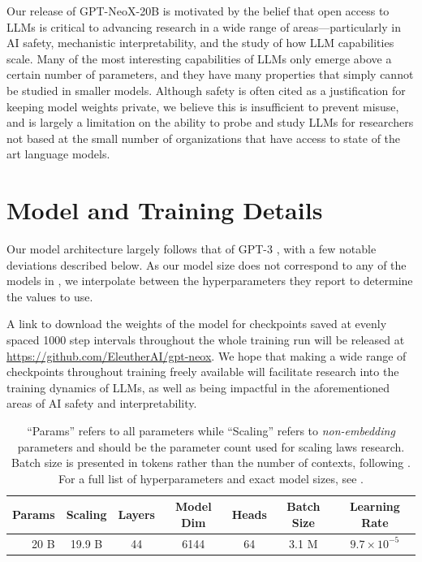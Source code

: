 \documentclass{article}
\newcommand{\model}{GPT-NeoX-20B}
\begin{document}
Our release of \model{} is motivated by the belief that open access to LLMs is critical to advancing research in a wide range of areas---particularly in AI safety, mechanistic interpretability, and the study of how LLM capabilities scale. Many of the most interesting capabilities of LLMs only emerge above a certain number of parameters, and they have many properties that simply cannot be studied in smaller models. Although safety is often cited as a justification for keeping model weights private, we believe this is insufficient to prevent misuse, and is largely a limitation on the ability to probe and study LLMs for researchers not based at the small number of organizations that have access to state of the art language models.

\section{Model and Training Details}
\label{sec:model-details}

Our model architecture largely follows that of GPT-3 \citep{brown2020language}, with a few notable deviations described below. As our model size does not correspond to any of the models in \citet{brown2020language}, we interpolate between the hyperparameters they report to determine the values to use.

A link to download the weights of the model for checkpoints saved at evenly spaced 1000 step intervals throughout the whole training run will be released at \url{https://github.com/EleutherAI/gpt-neox}. We hope that making a wide range of checkpoints throughout training freely available will facilitate research into the training dynamics of LLMs, as well as being impactful in the aforementioned areas of AI safety and interpretability.

\begin{table}[ht]
	\centering
	\begin{tabular}{rcccccc}
	    Params & Scaling & Layers & Model Dim & Heads & Batch Size & Learning Rate\\\midrule
	     20 B & 19.9 B & 44 & 6144 & 64 & 3.1 M & $9.7\times 10^{-5}$\\
	\end{tabular}
	\caption{``Params'' refers to all parameters while ``Scaling'' refers to \textit{non-embedding} parameters and should be the parameter count used for scaling laws research. Batch size is presented in tokens rather than the number of contexts, following \citet{brown2020language}. For a full list of hyperparameters and exact model sizes, see .}
	\label{table:interp}
\end{table}
\end{document}
